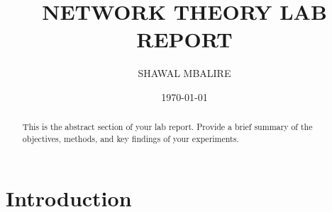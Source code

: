 \documentclass{article}
\title{NETWORK THEORY LAB REPORT}
\author{SHAWAL MBALIRE}
\date{\today}
\begin{document}
\maketitle
\newpage

\begin{abstract}
    This is the abstract section of your lab report. Provide a brief summary of the objectives, methods, and key findings of your experiments.
\end{abstract}

\section{Introduction}




\end{document}
